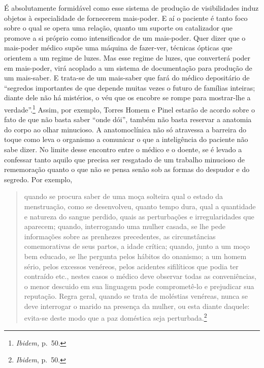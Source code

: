 É absolutamente formidável como esse sistema de produção de
visibilidades induz objetos à especialidade de fornecerem mais-poder. E
aí o paciente é tanto foco sobre o qual se opera uma relação, quanto um
suporte ou catalizador que promove a si próprio como intensificador de
um mais-poder. Quer dizer que o mais-poder médico supõe uma máquina de
fazer-ver, técnicas ópticas que orientem a um regime de luzes. Mas esse
regime de luzes, que converterá poder em mais-poder, virá acoplado a um
sistema de documentação para produção de um mais-saber. E trata-se de um
mais-saber que fará do médico depositário de ``segredos importantes de
que depende muitas vezes o futuro de famílias inteiras; diante dele não
há mistérios, o véu que os encobre se rompe para mostrar-lhe a
verdade''.\footnote{\textit{Ibidem,} p.~50.} Assim, por exemplo, Torres
Homem e Pinel estarão de acordo sobre o fato de que não basta saber
``onde dói'', também não basta reservar a anatomia do corpo ao olhar
minucioso. A anatomoclínica não só atravessa a barreira do toque como
leva o organismo a comunicar o que a inteligência do paciente não sabe
dizer. No limite desse encontro entre o médico e o doente, se é levado a
confessar tanto aquilo que precisa ser resgatado de um trabalho
minucioso de rememoração quanto o que não se pensa senão sob as formas
do despudor e do segredo. Por exemplo,

\begin{quote}
quando se procura saber de uma moça solteira qual o estado da
menstruação, como se desenvolveu, quanto tempo dura, qual a quantidade e
natureza do sangue perdido, quais as perturbações e irregularidades que
aparecem; quando, interrogando uma mulher casada, se lhe pede
informações sobre as prenhezes precedentes, as circunstâncias
comemorativas de seus partos, a idade crítica; quando, junto a um moço
bem educado, se lhe pergunta pelos hábitos do onanismo; a um homem
sério, pelos excessos venéreos, pelos acidentes sifilíticos que podia
ter contraído etc., nestes casos o médico deve observar todas as
conveniências, o menor descuido em sua linguagem pode comprometê-lo e
prejudicar sua reputação. Regra geral, quando se trata de moléstias
venéreas, nunca se deve interrogar o marido na presença da mulher, ou
esta diante daquele: evita-se deste modo que a paz doméstica seja
perturbada.\footnote{\textit{Ibidem}, p.~50.}
\end{quote}

